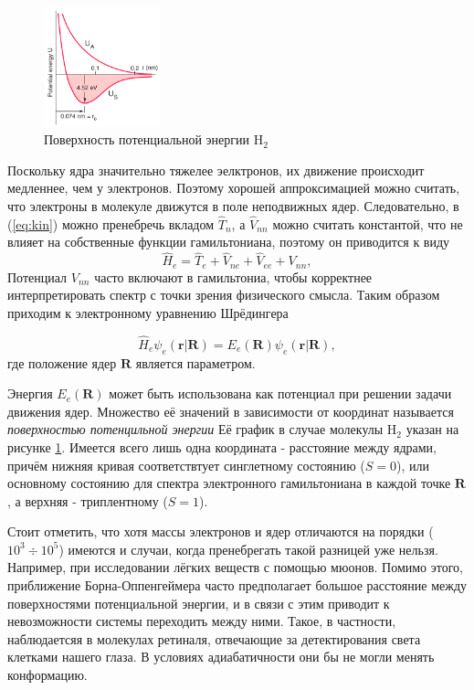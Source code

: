\documentclass[12pt, oneside]{article}
\numberwithin{equation}{section}  %
\begin{document}
\begin{figure}
    \centering
    \includegraphics[width=0.3\textwidth]{./images/H2.png}
    \caption{Поверхность потенциальной энергии H\(_2\)}
    \label{fig:H2PPE}
\end{figure}
Поскольку ядра значительно тяжелее эелктронов, их движение происходит медленнее, чем у электронов. Поэтому хорошей аппроксимацией можно считать, что электроны в молекуле движутся в поле неподвижных ядер. 
Следовательно, в (\ref{eq:kin}) можно пренебречь вкладом \(\hat{T}_n\), а \(\hat{V}_{nn}\) можно считать константой, что не влияет на собственные функции гамильтониана, поэтому он приводится к виду
\begin{equation}
    \hat{H}_e = \hat{T}_e + \hat{V}_{ne} + \hat{V}_{ee} + V_{nn},
    \label{eq:H_e}
\end{equation}
Потенциал \(V_{nn}\) часто включают в гамильтониа, чтобы корректнее интерпретировать спектр с точки зрения физического смысла.
Таким образом приходим к электронному уравнению Шрёдингера

\begin{equation}
    \hat{H}_e \psi_e (\bm{r}| \bm{R} ) = E_e (\bm{R}) \psi_e (\bm{r}| \bm{R}),
\end{equation}
где положение ядер \(\bm{R}\) является параметром.



Энергия \(E_e(\bm{R})\) может быть использована как потенциал при решении задачи движения ядер. Множество её значений в зависимости от координат называется \textit{поверхностью потенцильной энергии} Её график в случае молекулы H\(_2\) указан на рисунке \ref{fig:H2PPE}. Имеется всего лишь одна координата - расстояние между ядрами, причём нижняя кривая соответствтует синглетному состоянию (\(S = 0\)), или основному состоянию для спектра электронного гамильтониана в каждой точке \(\bm{R}\), а верхняя - триплентному (\(S = 1\)). 

Стоит отметить, что хотя массы электронов и ядер отличаются на порядки (\(10^3 \div 10^5\)) имеются и случаи, когда пренебрегать такой разницей уже нельзя. Например, при исследовании лёгких веществ с помощью мюонов. Помимо этого, приближение Борна-Оппенгеймера часто предполагает большое расстояние между поверхностями потенциальной энергии, и в связи с этим приводит к невозможности системы переходить между ними. Такое, в частности, наблюдаетсяя в молекулах ретиналя, отвечающие за детектирования света клетками нашего глаза. В условиях адиабатичности они бы не могли менять конформацию.
\end{document}
